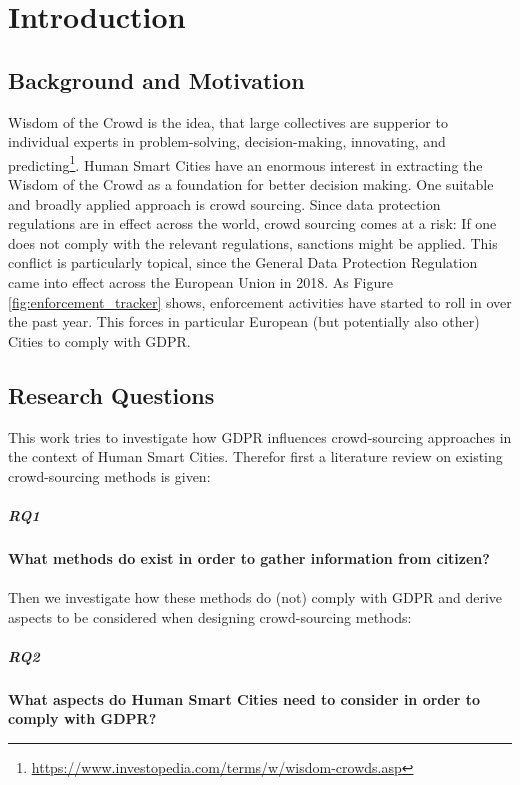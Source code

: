 \documentclass[a4paper,12pt]{report}
\begin{document}
	\tableofcontents
	
	\chapter{Introduction}
	
	\section{Background and Motivation}
	\startsection
		Wisdom of the Crowd is the idea, that large collectives are supperior to individual experts in problem-solving, decision-making, innovating, and predicting\footnote{\url{https://www.investopedia.com/terms/w/wisdom-crowds.asp}}. 
		Human Smart Cities have an enormous interest in extracting the Wisdom of the Crowd as a foundation for better decision making.
		One suitable and broadly applied approach is crowd sourcing.
		Since data protection regulations are in effect across the world, crowd sourcing comes at a risk: If one does not comply with the relevant regulations, sanctions might be applied.
		This conflict is particularly topical, since the General Data Protection Regulation came into effect across the European Union in 2018.
		As Figure \ref{fig:enforcement_tracker} shows, enforcement activities have started to roll in over the past year. This forces in particular European (but potentially also other) Cities to comply with GDPR.
	\closesection

	\section{Research Questions}
	\startsection
		This work tries to investigate how GDPR influences crowd-sourcing approaches in the context of Human Smart Cities.
		Therefor first a literature review on existing crowd-sourcing methods is given:
		\paragraph{\textbf{RQ1}}\label{para:RQ1}\textbf{What methods do exist in order to gather information from citizen?} \\ \\
		Then we investigate how these methods do (not) comply with GDPR and derive aspects to be considered when designing crowd-sourcing methods:
		\paragraph{\textbf{RQ2}}\label{para:RQ2}\textbf{What aspects do Human Smart Cities need to consider in order to comply with GDPR?}
	\closesection
	
\end{document}

